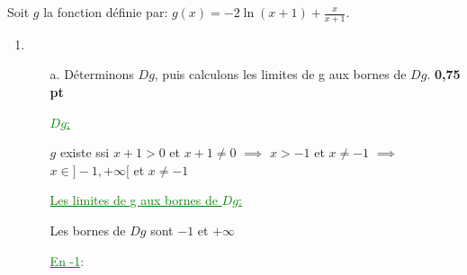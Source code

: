 \documentclass[12pt]{article}
\begin{document}
Soit $g$ la fonction définie par: $g(x)=-2\ln(x+1)+\frac{x}{x+1}.$
\begin{enumerate}
\item 
\begin{enumerate}
\item[a.] Déterminons $Dg$, puis calculons les limites de g aux bornes de $Dg$. \textbf{0,75 pt}

\textcolor{green}{\underline{$Dg$:}}

$g$ existe ssi $ x+1 >0 $ et $x+1\neq 0$ $\implies$ $ x>-1 $ et $x\neq -1$ $\implies$ $x\in]-1,+\infty[$ et $x\neq -1$ 
		\begin{center}
			\textcolor{green}{\boxed{Df=]-1,+\infty[}}
		\end{center}
\textcolor{green}{\underline{Les limites de g aux bornes de $Dg$:}}

Les bornes de $Dg$ sont $-1$ et $+\infty$

\textcolor{green}{\underline{En -1}:}


\end{enumerate}
\end{enumerate}
\end{document}
